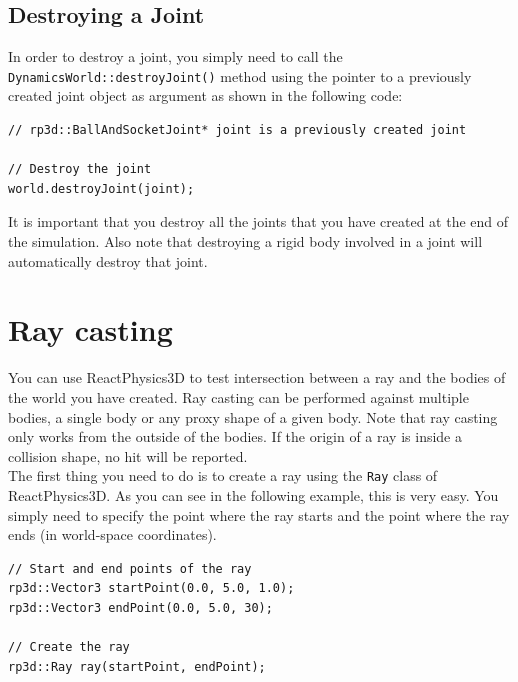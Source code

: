 \documentclass[a4paper,12pt]{article}
\begin{document}
    \subsection{Destroying a Joint}

    \begin{sloppypar}
    In order to destroy a joint, you simply need to call the \texttt{DynamicsWorld::destroyJoint()} method using the pointer to
    a previously created joint object as argument as shown in the following code: \\
   \end{sloppypar}

    \begin{lstlisting}
// rp3d::BallAndSocketJoint* joint is a previously created joint

// Destroy the joint
world.destroyJoint(joint);
  \end{lstlisting}

    \vspace{0.6cm}

    It is important that you destroy all the joints that you have created at the end of the simulation. Also note that destroying a
    rigid body involved in a joint will automatically destroy that joint.

    \section{Ray casting}
    \label{sec:raycasting}

    You can use ReactPhysics3D to test intersection between a ray and the bodies of the world you have created. Ray casting can be performed against multiple bodies, a single body or
    any proxy shape of a given body. Note that ray casting only works from the outside of the bodies. If the origin of a ray is inside a collision
    shape, no hit will be reported. \\

    The first thing you need to do is to create a ray using the \texttt{Ray} class of ReactPhysics3D. As you can see in the following example, this is very easy. You
    simply need to specify the point where the ray starts and the point where the ray ends (in world-space coordinates). \\

    \begin{lstlisting}
// Start and end points of the ray
rp3d::Vector3 startPoint(0.0, 5.0, 1.0);
rp3d::Vector3 endPoint(0.0, 5.0, 30);

// Create the ray
rp3d::Ray ray(startPoint, endPoint);
  \end{lstlisting}
\end{document}
